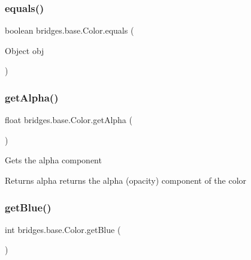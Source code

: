 \mbox{\label{classbridges_1_1base_1_1_color_a81fb4cb13c05a3da2f29f48b07189e7c}} 
\subsubsection{\texorpdfstring{equals()}{equals()}}
{\footnotesize\ttfamily boolean bridges.\+base.\+Color.\+equals (\begin{DoxyParamCaption}\item[{Object}]{obj }\end{DoxyParamCaption})}

\mbox{\label{classbridges_1_1base_1_1_color_a7c4247e31ecd8fcc61ef208d5deefe68}} 
\subsubsection{\texorpdfstring{get\+Alpha()}{getAlpha()}}
{\footnotesize\ttfamily float bridges.\+base.\+Color.\+get\+Alpha (\begin{DoxyParamCaption}{ }\end{DoxyParamCaption})}

Gets the alpha component

\begin{DoxyReturn}{Returns}
alpha returns the alpha (opacity) component of the color 
\end{DoxyReturn}
\mbox{\label{classbridges_1_1base_1_1_color_ad4b82e1eb9ff59857d2868edd8d4ce65}} 
\subsubsection{\texorpdfstring{get\+Blue()}{getBlue()}}
{\footnotesize\ttfamily int bridges.\+base.\+Color.\+get\+Blue (\begin{DoxyParamCaption}{ }\end{DoxyParamCaption})}

